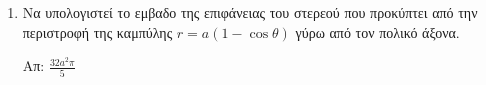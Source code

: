 \begin{center}
\end{center}

\vspace{\baselineskip}

\begin{enumerate}
\item Να υπολογιστεί το εμβαδο της επιφάνειας του στερεού που προκύπτει από την
    περιστροφή της καμπύλης $ r = a(1 - \cos{\theta}) $ γύρω από τον πολικό
	άξονα. 

	\hfill Απ: $ \frac{32 a^{2}\pi}{5} $
\end{enumerate}



